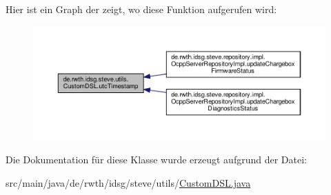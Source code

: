 Hier ist ein Graph der zeigt, wo diese Funktion aufgerufen wird\+:\nopagebreak
\begin{figure}[H]
\begin{center}
\leavevmode
\includegraphics[width=350pt]{classde_1_1rwth_1_1idsg_1_1steve_1_1utils_1_1_custom_d_s_l_a588f1723f1c9760604fb917d73e101b1_icgraph}
\end{center}
\end{figure}




Die Dokumentation für diese Klasse wurde erzeugt aufgrund der Datei\+:\begin{DoxyCompactItemize}
\item 
src/main/java/de/rwth/idsg/steve/utils/\hyperlink{_custom_d_s_l_8java}{Custom\+D\+S\+L.\+java}\end{DoxyCompactItemize}
